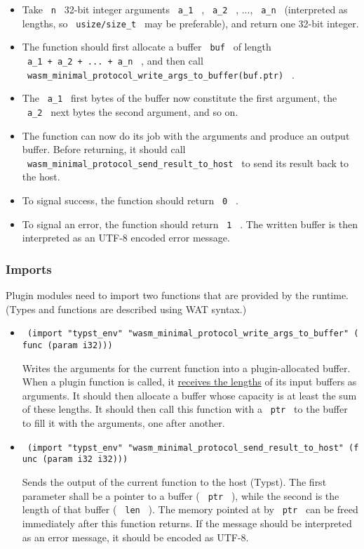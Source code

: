 \begin{itemize}
\item
  Take \texttt{\ n\ } 32-bit integer arguments \texttt{\ a\_1\ } ,
  \texttt{\ a\_2\ } , ..., \texttt{\ a\_n\ } (interpreted as lengths, so
  \texttt{\ usize/size\_t\ } may be preferable), and return one 32-bit
  integer.
\item
  The function should first allocate a buffer \texttt{\ buf\ } of length
  \texttt{\ a\_1\ +\ a\_2\ +\ ...\ +\ a\_n\ } , and then call
  \texttt{\ wasm\_minimal\_protocol\_write\_args\_to\_buffer(buf.ptr)\ }
  .
\item
  The \texttt{\ a\_1\ } first bytes of the buffer now constitute the
  first argument, the \texttt{\ a\_2\ } next bytes the second argument,
  and so on.
\item
  The function can now do its job with the arguments and produce an
  output buffer. Before returning, it should call
  \texttt{\ wasm\_minimal\_protocol\_send\_result\_to\_host\ } to send
  its result back to the host.
\item
  To signal success, the function should return \texttt{\ 0\ } .
\item
  To signal an error, the function should return \texttt{\ 1\ } . The
  written buffer is then interpreted as an UTF-8 encoded error message.
\end{itemize}

\subsubsection{Imports}\label{imports}

Plugin modules need to import two functions that are provided by the
runtime. (Types and functions are described using WAT syntax.)

\begin{itemize}
\item
  \texttt{\ (import\ "typst\_env"\ "wasm\_minimal\_protocol\_write\_args\_to\_buffer"\ (func\ (param\ i32)))\ }

  Writes the arguments for the current function into a plugin-allocated
  buffer. When a plugin function is called, it
  \hyperref[exports]{receives the lengths} of its input buffers as
  arguments. It should then allocate a buffer whose capacity is at least
  the sum of these lengths. It should then call this function with a
  \texttt{\ ptr\ } to the buffer to fill it with the arguments, one
  after another.
\item
  \texttt{\ (import\ "typst\_env"\ "wasm\_minimal\_protocol\_send\_result\_to\_host"\ (func\ (param\ i32\ i32)))\ }

  Sends the output of the current function to the host (Typst). The
  first parameter shall be a pointer to a buffer ( \texttt{\ ptr\ } ),
  while the second is the length of that buffer ( \texttt{\ len\ } ).
  The memory pointed at by \texttt{\ ptr\ } can be freed immediately
  after this function returns. If the message should be interpreted as
  an error message, it should be encoded as UTF-8.
\end{itemize}


